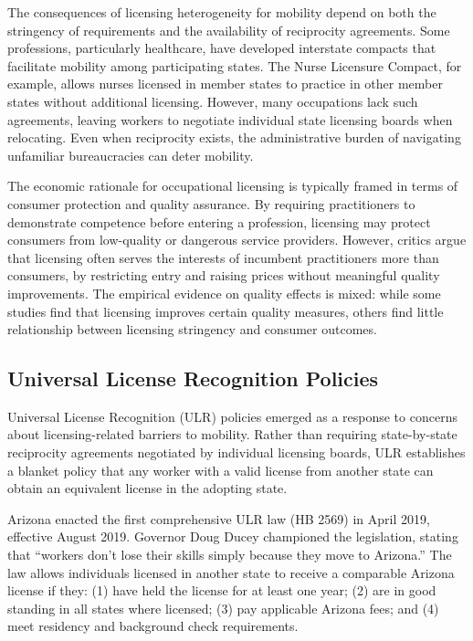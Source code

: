 \documentclass[12pt]{article}
\begin{document}
The consequences of licensing heterogeneity for mobility depend on both the stringency of requirements and the availability of reciprocity agreements. Some professions, particularly healthcare, have developed interstate compacts that facilitate mobility among participating states. The Nurse Licensure Compact, for example, allows nurses licensed in member states to practice in other member states without additional licensing. However, many occupations lack such agreements, leaving workers to negotiate individual state licensing boards when relocating. Even when reciprocity exists, the administrative burden of navigating unfamiliar bureaucracies can deter mobility.

The economic rationale for occupational licensing is typically framed in terms of consumer protection and quality assurance. By requiring practitioners to demonstrate competence before entering a profession, licensing may protect consumers from low-quality or dangerous service providers. However, critics argue that licensing often serves the interests of incumbent practitioners more than consumers, by restricting entry and raising prices without meaningful quality improvements. The empirical evidence on quality effects is mixed: while some studies find that licensing improves certain quality measures, others find little relationship between licensing stringency and consumer outcomes.

\subsection{Universal License Recognition Policies}

Universal License Recognition (ULR) policies emerged as a response to concerns about licensing-related barriers to mobility. Rather than requiring state-by-state reciprocity agreements negotiated by individual licensing boards, ULR establishes a blanket policy that any worker with a valid license from another state can obtain an equivalent license in the adopting state.

Arizona enacted the first comprehensive ULR law (HB 2569) in April 2019, effective August 2019. Governor Doug Ducey championed the legislation, stating that ``workers don't lose their skills simply because they move to Arizona.'' The law allows individuals licensed in another state to receive a comparable Arizona license if they: (1) have held the license for at least one year; (2) are in good standing in all states where licensed; (3) pay applicable Arizona fees; and (4) meet residency and background check requirements.
\end{document}
